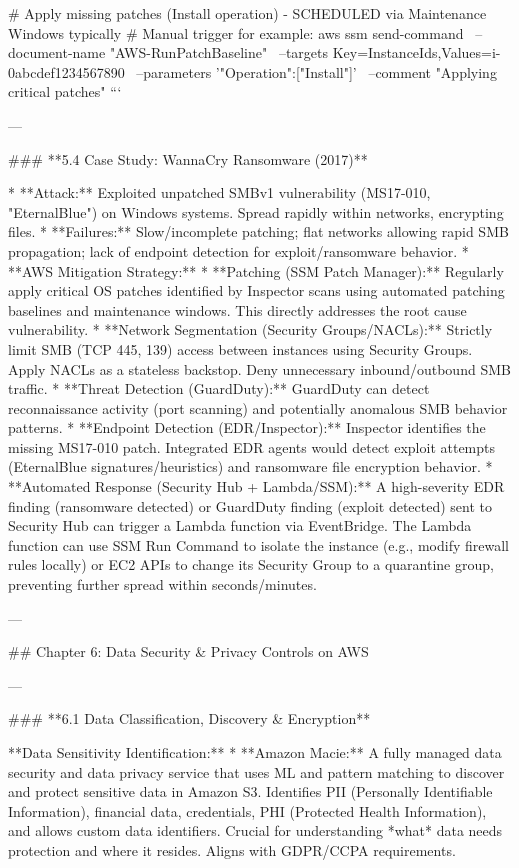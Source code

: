 \documentclass{article}
\begin{document}
# Apply missing patches (Install operation) - SCHEDULED via Maintenance Windows typically
# Manual trigger for example:
aws ssm send-command \
    --document-name "AWS-RunPatchBaseline" \
    --targets Key=InstanceIds,Values=i-0abcdef1234567890 \
    --parameters '{"Operation":["Install"]}' \
    --comment "Applying critical patches"
```

---

### **5.4 Case Study: WannaCry Ransomware (2017)**

* **Attack:** Exploited unpatched SMBv1 vulnerability (MS17-010, "EternalBlue") on Windows systems. Spread rapidly within networks, encrypting files.
* **Failures:** Slow/incomplete patching; flat networks allowing rapid SMB propagation; lack of endpoint detection for exploit/ransomware behavior.
* **AWS Mitigation Strategy:**
    * **Patching (SSM Patch Manager):** Regularly apply critical OS patches identified by Inspector scans using automated patching baselines and maintenance windows. This directly addresses the root cause vulnerability.
    * **Network Segmentation (Security Groups/NACLs):** Strictly limit SMB (TCP 445, 139) access between instances using Security Groups. Apply NACLs as a stateless backstop. Deny unnecessary inbound/outbound SMB traffic.
    * **Threat Detection (GuardDuty):** GuardDuty can detect reconnaissance activity (port scanning) and potentially anomalous SMB behavior patterns.
    * **Endpoint Detection (EDR/Inspector):** Inspector identifies the missing MS17-010 patch. Integrated EDR agents would detect exploit attempts (EternalBlue signatures/heuristics) and ransomware file encryption behavior.
    * **Automated Response (Security Hub + Lambda/SSM):** A high-severity EDR finding (ransomware detected) or GuardDuty finding (exploit detected) sent to Security Hub can trigger a Lambda function via EventBridge. The Lambda function can use SSM Run Command to isolate the instance (e.g., modify firewall rules locally) or EC2 APIs to change its Security Group to a quarantine group, preventing further spread within seconds/minutes.

---

## Chapter 6: Data Security & Privacy Controls on AWS

---

### **6.1 Data Classification, Discovery & Encryption**

**Data Sensitivity Identification:**
* **Amazon Macie:** A fully managed data security and data privacy service that uses ML and pattern matching to discover and protect sensitive data in Amazon S3. Identifies PII (Personally Identifiable Information), financial data, credentials, PHI (Protected Health Information), and allows custom data identifiers. Crucial for understanding *what* data needs protection and where it resides. Aligns with GDPR/CCPA requirements.
\end{document}
